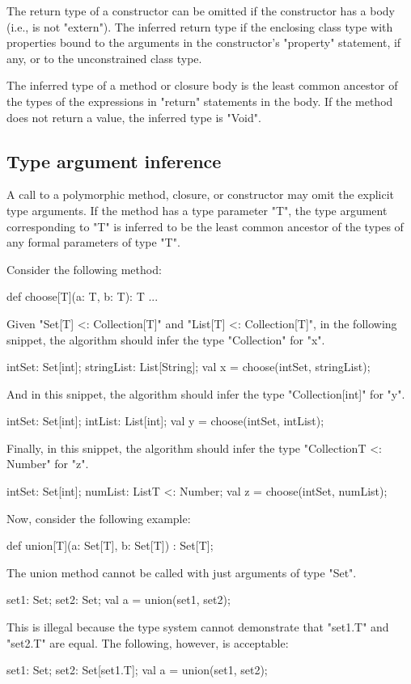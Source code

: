 The return type of a constructor can be omitted if the
constructor has a body (i.e., is not \xcd"extern").
The inferred return type if the enclosing class type with
properties bound to the arguments in the constructor's \xcd"property"
statement, if any, or to the unconstrained class type.

The inferred type of a method or closure body is the least common ancestor
of the types of the expressions in \xcd"return" statements
in the body.  If the method does not return a value, the
inferred type is \xcd"Void".

\subsection{Type argument inference}

A call to a polymorphic method, closure, or constructor may omit the
explicit type arguments.  If the method has a type parameter
\xcd"T", the type argument corresponding to \xcd"T" is inferred
to be the least common ancestor of the types of any formal
parameters of type \xcd"T".

Consider the following method:
\begin{xten}
def choose[T](a: T, b: T): T { ... }
\end{xten}
%
Given \xcd"Set[T] <: Collection[T]"
and \xcd"List[T] <: Collection[T]",
in the following snippet, the algorithm should infer the type
\xcd"Collection" for \xcd"x".
\begin{xten}
intSet: Set[int];
stringList: List[String];
val x = choose(intSet, stringList);
\end{xten}
%
And in this snippet, the algorithm should infer the type
\xcd"Collection[int]" for \xcd"y".
\begin{xten}
intSet: Set[int];
intList: List[int];
val y = choose(intSet, intList);
\end{xten}
%
Finally, in this snippet, the algorithm should infer the type
\xcd"Collection{T <: Number}" for \xcd"z".
\begin{xten}
intSet: Set[int];
numList: List{T <: Number};
val z = choose(intSet, numList);
\end{xten}

Now, consider the following example:
\begin{xten}
def union[T](a: Set[T], b: Set[T]) : Set[T];
\end{xten}
The union method cannot be called with just arguments of type \xcd"Set".
\begin{xten}
set1: Set;
set2: Set;
val a = union(set1, set2);
\end{xten}
This is illegal because the type system cannot demonstrate that
\xcd"set1.T" and \xcd"set2.T" are equal.
The following, however, is acceptable:
\begin{xten}
set1: Set;
set2: Set[set1.T];
val a = union(set1, set2);
\end{xten}

